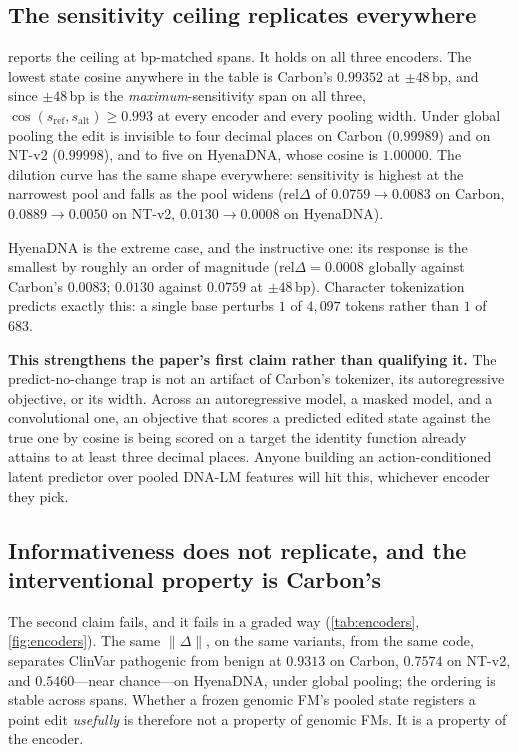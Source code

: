 \documentclass{article}
\newcommand{\sref}{s_{\mathrm{ref}}}
\newcommand{\salt}{s_{\mathrm{alt}}}
\newcommand{\D}{\Delta}
\begin{document}
\subsection{The sensitivity ceiling replicates everywhere}

 reports the ceiling at bp-matched spans. It holds on all three encoders. The
lowest state cosine anywhere in the table is Carbon's $0.99352$ at $\pm48$\,bp, and since
$\pm48$\,bp is the \emph{maximum}-sensitivity span on all three, $\cos(\sref,\salt)\ge0.993$ at every
encoder and every pooling width. Under global pooling the edit is invisible to four decimal places
on Carbon ($0.99989$) and on NT-v2 ($0.99998$), and to five on HyenaDNA, whose cosine is
$1.00000$. The dilution curve has the same shape everywhere: sensitivity is highest at the narrowest
pool and falls as the pool widens ($\mathrm{rel}\D$ of $0.0759 \to 0.0083$ on Carbon,
$0.0889\to0.0050$ on NT-v2, $0.0130\to0.0008$ on HyenaDNA).

HyenaDNA is the extreme case, and the instructive one: its response is the smallest by roughly an
order of magnitude ($\mathrm{rel}\D = 0.0008$ globally against Carbon's $0.0083$; $0.0130$ against $0.0759$
at $\pm48$\,bp). Character tokenization predicts exactly this: a single base perturbs $1$ of
$4{,}097$ tokens rather than $1$ of $683$.

\textbf{This strengthens the paper's first claim rather than qualifying it.} The predict-no-change
trap is not an artifact of Carbon's tokenizer, its autoregressive objective, or its width. Across an
autoregressive model, a masked model, and a convolutional one, an objective that scores a predicted
edited state against the true one by cosine is being scored on a target the identity function
already attains to at least three decimal places. Anyone building an action-conditioned latent
predictor over pooled DNA-LM features will hit this, whichever encoder they pick.

\tabEncoderTrap

\subsection{Informativeness does not replicate, and the interventional property is Carbon's}

The second claim fails, and it fails in a graded way (\cref{tab:encoders}, \cref{fig:encoders}). The
same $\lVert\D\rVert$, on the same variants, from the same code, separates ClinVar pathogenic from
benign at $0.9313$ on Carbon, $0.7574$ on NT-v2, and $0.5460$---near chance---on HyenaDNA, under
global pooling; the ordering is stable across spans. Whether a frozen genomic FM's pooled state
registers a point edit \emph{usefully} is therefore not a property of genomic FMs. It is a property
of the encoder.
\end{document}
